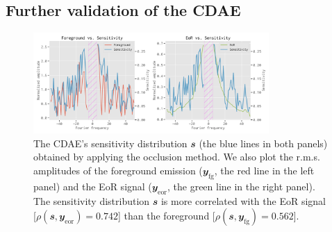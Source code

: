\documentclass[fleqn,usenatbib]{mnras}
\newcommand{\R}[1]{\mathrm{#1}}
\newcommand{\B}[1]{\mathbfit{#1}}
\newcommand{\editone}[1]{{\leavevmode\color{cyan}#1}}
\begin{document}
\editone{%
\subsection{Further validation of the CDAE}
\label{sec:validation}

\begin{figure}
  \centering
  \includegraphics[width=0.8\textwidth]{occlusion-fgeor}
  \caption{\label{fig:occ-fgeor}\editone{%
    The CDAE's sensitivity distribution $\B{s}$ (the blue lines in both
    panels) obtained by applying the occlusion method.
    We also plot the r.m.s\@. amplitudes of the foreground emission
    ($\B{y}_{\R{fg}}$, the red line in the left panel) and the EoR signal
    ($\B{y}_{\R{eor}}$, the green line in the right panel).
    The sensitivity distribution $\B{s}$ is more correlated with the EoR
    signal [$\rho(\B{s}, \B{y}_{\R{eor}}) = 0.742$] than the foreground
    [$\rho(\B{s}, \B{y}_{\R{fg}}) = 0.562$].
  }}
\end{figure}

}
\end{document}
